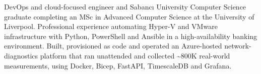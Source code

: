 



DevOps and cloud-focused engineer and Sabancı University Computer Science graduate completing an MSc in Advanced Computer Science at the University of Liverpool. Professional experience automating Hyper-V and VMware infrastructure with Python, PowerShell and Ansible in a high-availability banking environment. Built, provisioned as code and operated an Azure-hosted network-diagnostics platform that ran unattended and collected \textasciitilde 800K real-world measurements, using Docker, Bicep, FastAPI, TimescaleDB and Grafana.




